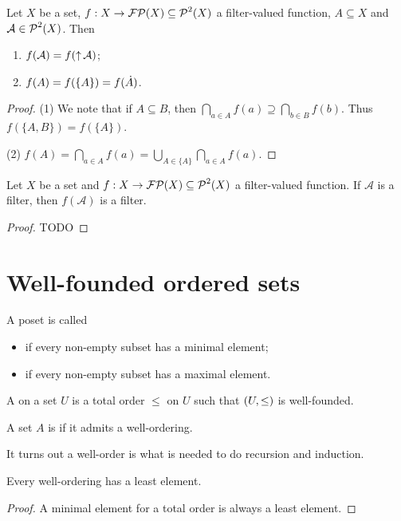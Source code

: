 \begin{lemma}
Let $X$ be a set, $f: X\to \operatorname{\mathcal{FP}}(X) \subseteq \operatorname{\mathcal{P}}^2(X)$ a filter-valued function, $A\subseteq X$ and $\mathcal{A}\in\operatorname{\mathcal{P}}^2(X)$. Then
\begin{enumerate}
\item $f(\mathcal{A}) = f(\operatorname{\uparrow}\mathcal{A})$;
\item $f(A) = f(\{A\}) = f(\dot{A})$.
\end{enumerate}
\end{lemma}
\begin{proof}
(1) We note that if $A\subseteq B$, then $\bigcap_{a\in A} f(a) \supseteq \bigcap_{b\in B} f(b)$. Thus $f(\{A,B\}) = f(\{A\})$.

(2) $f(A) = \bigcap_{a\in A} f(a) = \bigcup_{A\in\{A\}}\bigcap_{a\in A} f(a)$.
\end{proof}

\begin{proposition}
Let $X$ be a set and $f: X\to \operatorname{\mathcal{FP}}(X) \subseteq \operatorname{\mathcal{P}}^2(X)$ a filter-valued function. If $\mathcal{A}$ is a filter, then $f(\mathcal{A})$ is a filter.
\end{proposition}
\begin{proof}
TODO
\end{proof}

\chapter{Well-founded ordered sets}
\begin{definition}
A poset is called
\begin{itemize}
\item {} if every non-empty subset has a minimal element;
\item {} if every non-empty subset has a maximal element.
\end{itemize}

A  on a set $U$ is a total order $\leq$ on $U$ such that $\left( U,\leq \right)$ is well-founded.

A set $A$ is  if it admits a well-ordering.
\end{definition}
It turns out a well-order is what is needed to do recursion and induction.

\begin{lemma}
Every well-ordering has a least element.
\end{lemma}
\begin{proof}
A minimal element for a total order is always a least element.
\end{proof}

